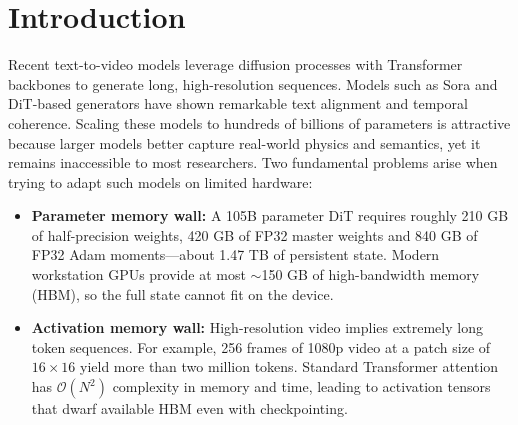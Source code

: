 \documentclass[11pt, letterpaper]{article}
\begin{document}
\begin{abstract}
On the activation-memory side, we study a family of interchangeable attention back-ends---Dense, Swin, 3D Deformable Slide Attention (3D-DSA), and a \textbf{Hybrid 3D-DSA + global register tokens} variant---under matched depth and width on structured-motion data with a held-out validation split. Pure 3D-DSA gives only a small ($\sim$8\% held-out MSE) edge over its own frozen-offset variant. Adding 64--128 global register tokens delivers a 9.5\%--20.7\% reduction in average loss at 1.5M parameters, but the gain \textbf{attenuates with scale}: at 240M parameters on the same task the register variant is only $\sim$1\% better than the pure-3D-DSA baseline (within run-to-run noise) and pays a 17\% step-time penalty. Whether registers recover their advantage at very large scale on real video remains open; the small-scale finding does not extrapolate to the parameter regime that motivates this paper.

MegaSlide-DiT does \emph{not} train a 105B model, does \emph{not} run on an H200, and is \emph{not} evaluated on official VBench or real video---those are scoped as future work and are explicitly labelled as projections wherever they appear. It offers a measured, reproducible path for full-parameter adaptation of large video diffusion models on a single high-end workstation, together with an honest characterisation of the PCIe regime that bounds its throughput.
\end{abstract}

\section{Introduction}
Recent text-to-video models leverage diffusion processes with Transformer backbones to generate long, high-resolution sequences. Models such as Sora and DiT-based generators have shown remarkable text alignment and temporal coherence. Scaling these models to hundreds of billions of parameters is attractive because larger models better capture real-world physics and semantics, yet it remains inaccessible to most researchers. Two fundamental problems arise when trying to adapt such models on limited hardware:

\begin{itemize}
    \item \textbf{Parameter memory wall:} A 105B parameter DiT requires roughly 210 GB of half-precision weights, 420 GB of FP32 master weights and 840 GB of FP32 Adam moments—about 1.47 TB of persistent state. Modern workstation GPUs provide at most $\sim$150 GB of high-bandwidth memory (HBM), so the full state cannot fit on the device.
    \item \textbf{Activation memory wall:} High-resolution video implies extremely long token sequences. For example, 256 frames of 1080p video at a patch size of $16\times16$ yield more than two million tokens. Standard Transformer attention has $\mathcal{O}(N^2)$ complexity in memory and time, leading to activation tensors that dwarf available HBM even with checkpointing.
\end{itemize}
\end{document}
